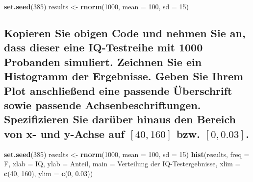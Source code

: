 \documentclass[12pt,a4paper]{article}
\newenvironment{Shaded}{\begin{snugshade}}{\end{snugshade}}
\newcommand{\AttributeTok}[1]{\textcolor[rgb]{0.13,0.29,0.53}{#1}}
\newcommand{\DecValTok}[1]{\textcolor[rgb]{0.00,0.00,0.81}{#1}}
\newcommand{\FloatTok}[1]{\textcolor[rgb]{0.00,0.00,0.81}{#1}}
\newcommand{\FunctionTok}[1]{\textcolor[rgb]{0.13,0.29,0.53}{\textbf{#1}}}
\newcommand{\NormalTok}[1]{#1}
\newcommand{\OtherTok}[1]{\textcolor[rgb]{0.56,0.35,0.01}{#1}}
\newcommand{\StringTok}[1]{\textcolor[rgb]{0.31,0.60,0.02}{#1}}
\begin{document}
\begin{Shaded}
\begin{Highlighting}[]
\FunctionTok{set.seed}\NormalTok{(}\DecValTok{385}\NormalTok{)}
\NormalTok{results }\OtherTok{\textless{}{-}} \FunctionTok{rnorm}\NormalTok{(}\DecValTok{1000}\NormalTok{, }\AttributeTok{mean =} \DecValTok{100}\NormalTok{, }\AttributeTok{sd =} \DecValTok{15}\NormalTok{)}
\end{Highlighting}
\end{Shaded}

\subsection{\texorpdfstring{Kopieren Sie obigen Code und nehmen Sie an,
dass dieser eine IQ-Testreihe mit 1000 Probanden simuliert. Zeichnen Sie
ein Histogramm der Ergebnisse. Geben Sie Ihrem Plot anschließend eine
passende Überschrift sowie passende Achsenbeschriftungen. Spezifizieren
Sie darüber hinaus den Bereich von x- und y-Achse auf \([40,160]\) bzw.
\([0,0.03]\).}{Kopieren Sie obigen Code und nehmen Sie an, dass dieser eine IQ-Testreihe mit 1000 Probanden simuliert. Zeichnen Sie ein Histogramm der Ergebnisse. Geben Sie Ihrem Plot anschließend eine passende Überschrift sowie passende Achsenbeschriftungen. Spezifizieren Sie darüber hinaus den Bereich von x- und y-Achse auf {[}40,160{]} bzw. {[}0,0.03{]}.}}\label{kopieren-sie-obigen-code-und-nehmen-sie-an-dass-dieser-eine-iq-testreihe-mit-1000-probanden-simuliert.-zeichnen-sie-ein-histogramm-der-ergebnisse.-geben-sie-ihrem-plot-anschlieuxdfend-eine-passende-uxfcberschrift-sowie-passende-achsenbeschriftungen.-spezifizieren-sie-daruxfcber-hinaus-den-bereich-von-x--und-y-achse-auf-40160-bzw.-00.03.}

\begin{Shaded}
\begin{Highlighting}[]
    \FunctionTok{set.seed}\NormalTok{(}\DecValTok{385}\NormalTok{)}
\NormalTok{    results }\OtherTok{\textless{}{-}} \FunctionTok{rnorm}\NormalTok{(}\DecValTok{1000}\NormalTok{, }\AttributeTok{mean =} \DecValTok{100}\NormalTok{, }\AttributeTok{sd =} \DecValTok{15}\NormalTok{)}
    \FunctionTok{hist}\NormalTok{(results, }
         \AttributeTok{freq =}\NormalTok{ F,}
         \AttributeTok{xlab =} \StringTok{\textquotesingle{}IQ\textquotesingle{}}\NormalTok{, }
         \AttributeTok{ylab =} \StringTok{\textquotesingle{}Anteil\textquotesingle{}}\NormalTok{, }
         \AttributeTok{main =} \StringTok{\textquotesingle{}Verteilung der IQ{-}Testergebnisse\textquotesingle{}}\NormalTok{, }
         \AttributeTok{xlim =} \FunctionTok{c}\NormalTok{(}\DecValTok{40}\NormalTok{, }\DecValTok{160}\NormalTok{), }
         \AttributeTok{ylim =} \FunctionTok{c}\NormalTok{(}\DecValTok{0}\NormalTok{, }\FloatTok{0.03}\NormalTok{))}
\end{Highlighting}
\end{Shaded}
\end{document}
